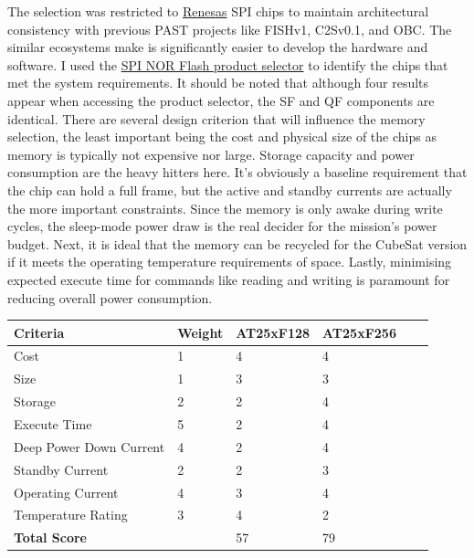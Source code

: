 The selection was restricted to \href{https://www.renesas.com/en}{Renesas} SPI chips to maintain architectural consistency with previous PAST projects like FISHv1, C2Sv0.1, and OBC. The similar ecosystems make is significantly easier to develop the hardware and software. I used the \href{https://www.renesas.com/en/products/memory-logic/non-volatile-memory/spi-nor-flash/product-selector?field-memory-density=128%2C256&field-operating-voltage-range=2.7%2C3.6}{SPI NOR Flash product selector} to identify the chips that met the system requirements. It should be noted that although four results appear when accessing the product selector, the SF and QF components are identical.
\nl
There are several design criterion that will influence the memory selection, the least important being the cost and physical size of the chips as memory is typically not expensive nor large. Storage capacity and power consumption are the heavy hitters here. It's obviously a baseline requirement that the chip can hold a full frame, but the active and standby currents are actually the more important constraints. Since the memory is only awake during write cycles, the sleep-mode power draw is the real decider for the mission's power budget. Next, it is ideal that the memory can be recycled for the CubeSat version if it meets the operating temperature requirements of space. Lastly, minimising expected execute time for commands like reading and writing is paramount for reducing overall power consumption.

\begin{indentedtable}
    \centering
    \begin{tabular}{|l|l|l|l|l|l|}
        \hline
        \textbf{Criteria} & \textbf{Weight} & \textbf{AT25xF128} & \textbf{AT25xF256} \\
        \hline
        Cost & 1 & 4 & 4 \\
        \hline
        Size & 1 & 3 & 3 \\
        \hline
        Storage & 2 & 2 & 4 \\
        \hline
        Execute Time & 5 & 2 & 4 \\
        \hline
        Deep Power Down Current & 4 & 2 & 4 \\
        \hline
        Standby Current & 2 & 2 & 3 \\
        \hline
        Operating Current & 4 & 3 & 4 \\
        \hline
        Temperature Rating & 3 & 4 & 2 \\
        \hline
        \hline
        \textbf{Total Score} &  & 57 & 79 \\
        \hline
    \end{tabular}
    
    \caption{C2Sv1 external memory trade study comparing the 128 and 256 Mbit versions of the AT25xF on a scale (1-5).}
    \label{tab:v1-trade-memory}
\end{indentedtable}

